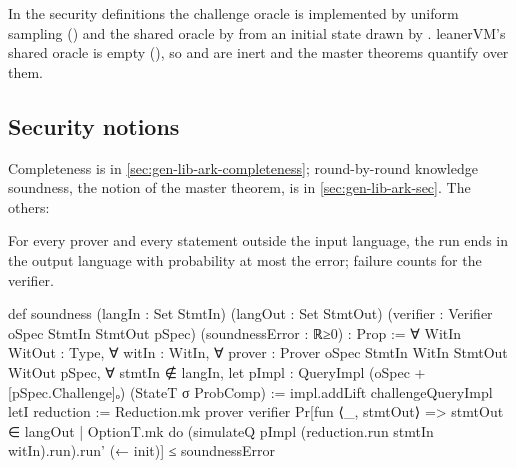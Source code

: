 
In the security definitions the challenge oracle is implemented by uniform sampling
() and the shared oracle  by
 from an initial state drawn by
. leanerVM's shared oracle is empty (), so  and
 are inert and the master theorems quantify over them.



\subsection{Security notions}\label{sec:gen-lib-ark-notions}

Completeness is in \cref{sec:gen-lib-ark-completeness}; round-by-round knowledge soundness, the
notion of the master theorem, is in \cref{sec:gen-lib-ark-sec}. The others:

\begin{define}{}
For every prover and every statement outside the input language, the run ends in the output
language with probability at most the error; failure counts for the verifier.
\end{define}

\begin{leancode}
def soundness (langIn : Set StmtIn) (langOut : Set StmtOut)
    (verifier : Verifier oSpec StmtIn StmtOut pSpec)
    (soundnessError : ℝ≥0) : Prop :=
  ∀ WitIn WitOut : Type,
  ∀ witIn : WitIn,
  ∀ prover : Prover oSpec StmtIn WitIn StmtOut WitOut pSpec,
  ∀ stmtIn ∉ langIn,
    let pImpl : QueryImpl (oSpec + [pSpec.Challenge]ₒ) (StateT σ ProbComp) :=
      impl.addLift challengeQueryImpl
    letI reduction := Reduction.mk prover verifier
    Pr[fun ⟨_, stmtOut⟩ => stmtOut ∈ langOut | OptionT.mk do
      (simulateQ pImpl (reduction.run stmtIn witIn).run).run' (← init)] ≤ soundnessError
\end{leancode}

